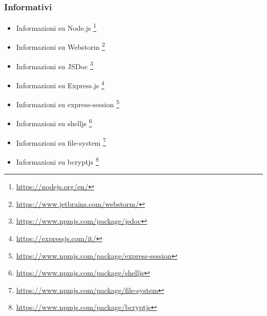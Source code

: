\subsubsection{Informativi}
	\begin{itemize}
	\item Informazioni su Node.js
	\footnote{\url {https://nodejs.org/en/}}
	\item Informazioni su Webstorm
	\footnote{\url {https://www.jetbrains.com/webstorm/}}
	\item Informazioni su JSDoc
	\footnote{\url {https://www.npmjs.com/package/jsdoc}}
	\item Informazioni su Express.js
	\footnote{\url {https://expressjs.com/it/}}
	\item Informazioni su express-session
	\footnote{\url {https://www.npmjs.com/package/express-session}}
	\item Informazioni su shelljs
	\footnote{\url {https://www.npmjs.com/package/shelljs}}
	\item Informazioni su file-system
	\footnote{\url {https://www.npmjs.com/package/file-system}}
	\item Informazioni su bcryptjs
	\footnote{\url {https://www.npmjs.com/package/bcryptjs}}
\end{itemize}